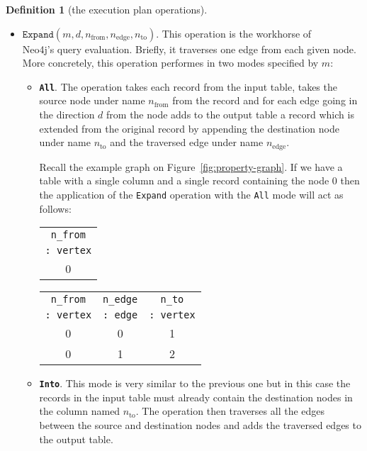 \documentclass[14pt]{constructor-thesis}
\theoremstyle{definition}
\newtheorem{definition}{Definition}
\begin{document}
\begin{definition}[the execution plan operations]
\begin{itemize}
    \item $\texttt{Expand}(m, d, n_{\mathrm{from}}, n_{\mathrm{edge}}, n_{\mathrm{to}})$. This operation is the workhorse of \\ Neo4j's query evaluation. Briefly, it traverses one edge from each given node. More concretely, this operation performes in two modes specified by $m$:
    \begin{itemize}
      \item \textbf{\texttt{All}}.
      The operation takes each record from the input table, takes the source node under name $n_{\mathrm{from}}$ from the record and for each edge going in the direction $d$ from the node adds to the output table a record which is extended from the original record by appending the destination node under name $n_{\mathrm{to}}$ and the traversed edge under name $n_{\mathrm{edge}}$.

      Recall the example graph on Figure~\ref{fig:property-graph}. If we have a table with a single column and a single record containing the node 0 then the application of the \texttt{Expand} operation with the \texttt{All} mode will act as follows:

      \begin{center}
        \begin{tabular}{|c|}
          \hline
          \texttt{n\_from} \\
          \texttt{: vertex} \\
          \hline
          0 \\
          \hline
        \end{tabular}
        \quad
        \quad
        \begin{tabular}{|c|c|c|}
          \hline
          \texttt{n\_from} & \texttt{n\_edge} & \texttt{n\_to} \\
          \texttt{: vertex} & \texttt{: edge} & \texttt{: vertex} \\
          \hline
          0 & 0 & 1 \\
          0 & 1 & 2 \\
          \hline
        \end{tabular}
      \end{center}

      \item \textbf{\texttt{Into}}.
      This mode is very similar to the previous one but in this case the records in the input table must already contain the destination nodes in the column named $n_{\mathrm{to}}$. The operation then traverses all the edges between the source and destination nodes and adds the traversed edges to the output table.


\end{itemize}
\end{itemize}
\end{definition}
\end{document}
